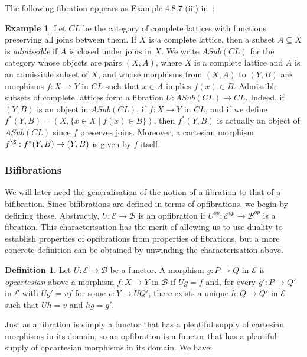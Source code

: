 \documentclass{LMCS}
\newcommand{\ra}{\rightarrow}
\newcommand\E{{\mathcal E}}
\newcommand\B{{\mathcal B}}
\theoremstyle{plain}
\theoremstyle{remark}
\theoremstyle{definition}
\newtheorem{definition}[theorem]{Definition}
\newtheorem{example}[theorem]{Example}
\begin{document}
The following fibration appears as Example 4.8.7 (iii) in~\cite{jac99}:

\begin{example}\label{ex:CL}
  Let $CL$ be the category of complete lattices with functions
  preserving all joins between them. If $X$ is a complete lattice,
  then a subset $A \subseteq X$ is {\em admissible} if $A$ is closed
  under joins in $X$. We write $ASub(CL)$ for the category whose
  objects are pairs $(X,A)$, where $X$ is a complete lattice and $A$
  is an admissible subset of $X$, and whose morphisms from $(X,A)$ to
  $(Y,B)$ are morphisms $f : X \rightarrow Y$ in $CL$ such that $x \in
  A$ implies $f(x) \in B$.  Admissible subsets of complete lattices
  form a fibration $U : ASub(CL) \rightarrow CL$. Indeed, if $(Y,B)$
  is an object in $ASub(CL)$, if $f : X \to Y$ in $CL$, and if we
  define $f^*(Y,B) = (X, \{x \in X \mid f(x) \in B\})$, then
  $f^*(Y,B)$ is actually an object of $ASub(CL)$ since $f$ preserves
  joins. Moreover, a cartesian morphism $f^\S : f^*(Y,B) \rightarrow
  (Y,B)$ is given by $f$ itself.
\end{example}

\subsubsection{Bifibrations}

We will later need the generalisation of the notion of a fibration to
that of a bifibration. Since bifibrations are defined in terms of
opfibrations, we begin by defining these. Abstractly, $U : \E \to \B$
is an opfibration if $U^{op}:\E^{op} \ra \B^{op}$ is a fibration. This
characterisation has the merit of allowing us to use duality to
establish properties of opfibrations from properties of fibrations,
but a more concrete definition can be obtained by unwinding the
characterisation above.

\begin{definition}
  Let $U : \E \ra \B$ be a functor. A morphism $g : P \ra Q$ in $\E$
  is {\em opcartesian} above a morphism $f : X \ra Y$ in $\B$ if $Ug =
  f$ and, for every $g' : P \ra Q'$ in $\E$ with $Ug' = v f$ for
  some $v : Y \ra UQ'$, there exists a unique $h : Q \ra Q'$ in $\E$
  such that $Uh = v$ and $h g = g'$.
\end{definition}
\noindent
Just as a fibration is simply a functor that has a plentiful supply
of cartesian morphisms in its domain, so an opfibration is a functor
that has a plentiful supply of opcartesian morphisms in its
domain. We have:
\end{document}
